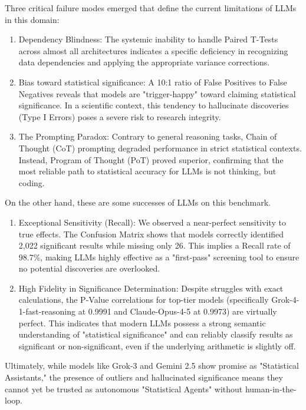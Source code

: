 \documentclass{article}
\begin{document}
Three critical failure modes emerged that define the current limitations of LLMs in this domain:
\begin{enumerate}
    \item Dependency Blindness: The systemic inability to handle Paired T-Tests across almost all architectures indicates a specific deficiency in recognizing data dependencies and applying the appropriate variance corrections.
    \item Bias toward statistical significance: A 10:1 ratio of False Positives to False Negatives reveals that models are "trigger-happy" toward claiming statistical significance. In a scientific context, this tendency to hallucinate discoveries (Type I Errors) poses a severe risk to research integrity.
    \item The Prompting Paradox: Contrary to general reasoning tasks, Chain of Thought (CoT) prompting degraded performance in strict statistical contexts. Instead, Program of Thought (PoT) proved superior, confirming that the most reliable path to statistical accuracy for LLMs is not thinking, but coding.
\end{enumerate}
On the other hand, these are some successes of LLMs on this benchmark.
\begin{enumerate}
    \item Exceptional Sensitivity (Recall): We observed a near-perfect sensitivity to true effects. The Confusion Matrix shows that models correctly identified 2,022 significant results while missing only 26. This implies a Recall rate of 98.7\%, making LLMs highly effective as a "first-pass" screening tool to ensure no potential discoveries are overlooked.
    \item High Fidelity in Significance Determination: Despite struggles with exact calculations, the P-Value correlations for top-tier models (specifically Grok-4-1-fast-reasoning at 0.9991 and Claude-Opus-4-5 at 0.9973) are virtually perfect. This indicates that modern LLMs possess a strong semantic understanding of "statistical significance" and can reliably classify results as significant or non-significant, even if the underlying arithmetic is slightly off.
\end{enumerate}
Ultimately, while models like Grok-3 and Gemini 2.5 show promise as "Statistical Assistants," the presence of outliers and hallucinated significance means they cannot yet be trusted as autonomous "Statistical Agents" without human-in-the-loop.
\end{document}
